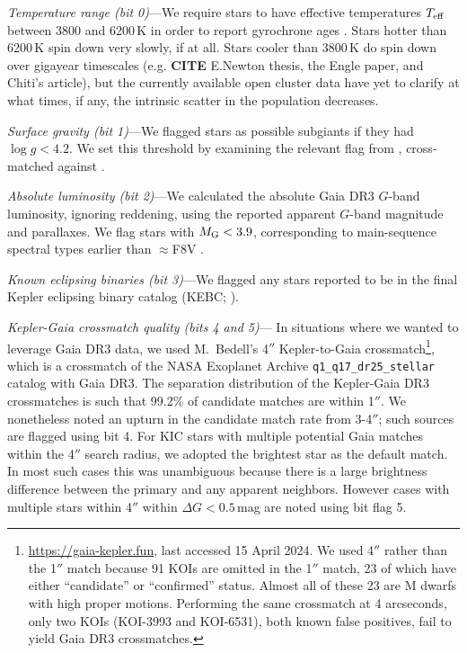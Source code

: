 \documentclass[11pt,twocolumn,tighten]{aastex63}
\begin{document}
{\it Temperature range (bit 0)}---We require stars to have effective
temperatures $T_{\rm eff}$ between 3800 and 6200\,K in order to report
gyrochrone ages \citep{Bouma_2023}.   Stars hotter than 6200\,K spin
down very slowly, if at all.  Stars cooler than 3800\,K do spin down
over gigayear timescales (e.g. {\bf CITE} E.Newton thesis, the Engle
paper, and Chiti's article), but the currently available open cluster
data have yet to clarify at what times, if any, the intrinsic scatter
in the population decreases.

{\it Surface gravity (bit 1)}---We flagged stars as possible subgiants
if they had $\log g < 4.2$.  We set this threshold by examining the
relevant flag from \citet{berger_2018_radii_evolnstates},
cross-matched against \citet{Berger_2020a_catalog}.

{\it Absolute luminosity (bit 2)}---We calculated the absolute Gaia
DR3 $G$-band luminosity, ignoring reddening, using the reported
apparent $G$-band magnitude and parallaxes.  We flag stars with
$M_{\rm G} < 3.9$, corresponding to main-sequence spectral types
earlier than $\approx$F8V \citep{Pecaut_2013}.

{\it Known eclipsing binaries (bit 3)}---We flagged any stars reported
to be in the final Kepler eclipsing binary catalog (KEBC;
\citealt{2016AJ....151...68K}).

{\it Kepler-Gaia crossmatch quality (bits 4 and 5)}--- In situations
where we wanted to leverage Gaia DR3 data, we used M.~Bedell's 4$''$
Kepler-to-Gaia crossmatch\footnote{\url{https://gaia-kepler.fun}, last
accessed 15 April 2024.  We used 4$''$ rather than the 1$''$ match
because 91 KOIs are omitted in the 1$''$ match, 23 of which have
either ``candidate'' or ``confirmed'' status.  Almost all of these 23
are M dwarfs with high proper motions.  Performing the same crossmatch
at 4 arcseconds, only two KOIs (KOI-3993 and KOI-6531), both known
false positives, fail to yield Gaia DR3 crossmatches.}, which is a
crossmatch of the NASA Exoplanet Archive
\texttt{q1\_q17\_dr25\_stellar} catalog with Gaia DR3.  The separation
distribution of the Kepler-Gaia DR3 crossmatches is such that 99.2\%
of candidate matches are within 1$''$.   We nonetheless noted an
upturn in the candidate match rate from 3-4$''$; such sources are
flagged using bit 4.  For KIC stars with multiple potential Gaia
matches within the 4$''$ search radius, we adopted the brightest star
as the default match.  In most such cases this was unambiguous because
there is a large brightness difference between the primary and any
apparent neighbors.  However cases with multiple stars within 4$''$
within $\Delta G$$<$$0.5$\,mag are noted using bit flag 5.  
\end{document}
